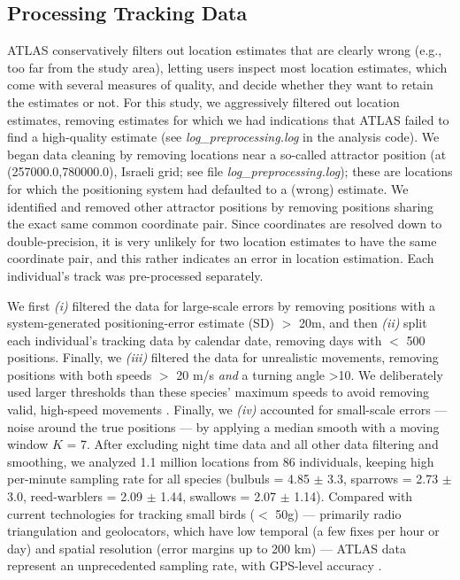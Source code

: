 \subsection*{Processing Tracking Data}

ATLAS conservatively filters out location estimates that are clearly wrong (e.g., too far from the study area), letting users inspect most location estimates, which come with several measures of quality, 
and decide whether they want to retain the estimates or not. 
For this study, we aggressively filtered out location estimates, removing estimates for which we had indications that ATLAS failed to find a high-quality estimate \citep{gupte2022d} (see \emph{log\_preprocessing.log} in the analysis code).
We began data cleaning by removing locations near a so-called attractor position (at (257000.0,780000.0), Israeli grid; see file \textit{log\_preprocessing.log}); these are locations for which the positioning system had defaulted to a (wrong) estimate.
We identified and removed other attractor positions by removing positions sharing the exact same common coordinate pair. 
Since coordinates are resolved down to double-precision, it is very unlikely for two location estimates to have the same coordinate pair, and this rather indicates an error in location estimation.
Each individual's track was pre-processed separately.

We first \textit{(i)} filtered the data for large-scale errors by removing positions with a system-generated positioning-error estimate (SD) $>$ 20m, and then \textit{(ii)} split each individual's tracking data by calendar date, removing days with $<$ 500 positions. 
Finally, we \textit{(iii)} filtered the data for unrealistic movements, removing positions with both speeds $>$ 20 m/s \emph{and} a turning angle >10\textdegree.
We deliberately used larger thresholds than these species' maximum speeds to avoid removing valid, high-speed movements \citep{gupte2022d}.
Finally, we \textit{(iv)} accounted for small-scale errors --- noise around the true positions --- by applying a median smooth with a moving window $K$ = 7.
After excluding night time data and all other data filtering and smoothing, we analyzed 1.1 million locations from 86 individuals, keeping high per-minute sampling rate for all species (bulbuls = 4.85 $\pm$ 3.3, sparrows = 2.73 $\pm$ 3.0, reed-warblers = 2.09 $\pm$ 1.44, swallows = 2.07 $\pm$ 1.14).
Compared with current technologies for tracking small birds ($<$ 50g) --- primarily radio triangulation and geolocators, which have low temporal (a few fixes per hour or day) and spatial resolution (error margins up to 200 km) \citep{bridge2013} --- ATLAS data represent an unprecedented sampling rate, with GPS-level accuracy \citep{beardsworth2022mee}.

